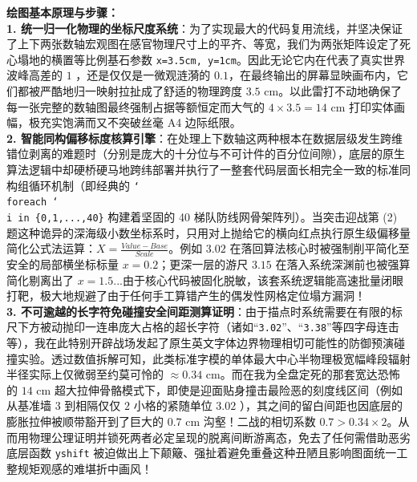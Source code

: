 {\small\color{blue!70!black}
\textbf{绘图基本原理与步骤：}\\
\textbf{1. 统一归一化物理的坐标尺度系统}：为了实现最大的代码复用流线，并坚决保证了上下两张数轴宏观图在感官物理尺寸上的平齐、等宽，我们为两张矩阵设定了死心塌地的横置等比例基石参数 \texttt{x=3.5cm, y=1cm}。因此无论它内在代表了真实世界波峰高差的 $1$ ，还是仅仅是一微观涟漪的 $0.1$，在最终输出的屏幕显映画布内，它们都被严酷地归一映射拉扯成了舒适的物理跨度 $3.5\text{ cm}$。以此雷打不动地确保了每一张完整的数轴图最终强制占据等额恒定而大气的 $4 \times 3.5 = 14\text{ cm}$ 打印实体画幅，极充实饱满而又不突破丝毫 A4 边际纸限。\\
\textbf{2. 智能同构偏移标度核算引擎}：在处理上下数轴这两种根本在数据层级发生跨维错位剥离的难题时（分别是庞大的十分位与不可计件的百分位间隙），底层的原生算法逻辑中却硬桥硬马地跨纬部署并执行了一整套代码层面长相完全一致的标准同构组循环机制（即经典的 \texttt{\char`\\foreach \char`\\i in \{0,1,...,40\}} 构建着坚固的 40 梯队防线网骨架阵列）。当突击迎战第 (2) 题这种诡异的深海级小数坐标系时，只用对上抛给它的横向红点执行原生级偏移量简化公式法运算：$X = \frac{Value - Base}{Scale}$。例如 $3.02$ 在落回算法核心时被强制削平简化至安全的局部横坐标标量 $x = 0.2$；更深一层的游尺 $3.15$ 在落入系统深渊前也被强算简化剔离出了 $x = 1.5$...由于核心代码被固化脱敏，该套系统逻辑能高速批量闭眼打靶，极大地规避了由于任何手工算错产生的偶发性网格定位塌方漏洞！\\
\textbf{3. 不可逾越的长字符免碰撞安全间距测算证明}：由于描点时系统需要在有限的标尺下方被动抛印一连串庞大占格的超长字符（诸如“\texttt{3.02}”、“\texttt{3.38}”等四字母连击等），我在此特别开辟战场发起了原生英文字体边界物理相切可能性的防御预演碰撞实验。透过数值拆解可知，此类标准字模的单体最大中心半物理极宽幅峰段辐射半径实际上仅微弱至约莫可怜的 $\approx0.34\text{ cm}$。而在我为全盘定死的那套宽达恐怖的 $14\text{ cm}$ 超大拉伸骨骼模式下，即使是迎面贴身撞击最险恶的刻度线区间（例如从基准墙 $3$ 到相隔仅仅 $2$ 小格的紧随单位 $3.02$ ），其之间的留白间距也因底层的膨胀拉伸被顺带豁开到了巨大的 $0.7\text{ cm}$ 沟壑！二战的相切系数 $0.7 > 0.34\times2$。从而用物理公理证明并锁死两者必定呈现的脱离间断游离态，免去了任何需借助恶劣底层函数 \texttt{yshift} 被迫做出上下颠簸、强扯着避免重叠这种丑陋且影响图面统一工整规矩观感的难堪折中画风！
}


\newpage
